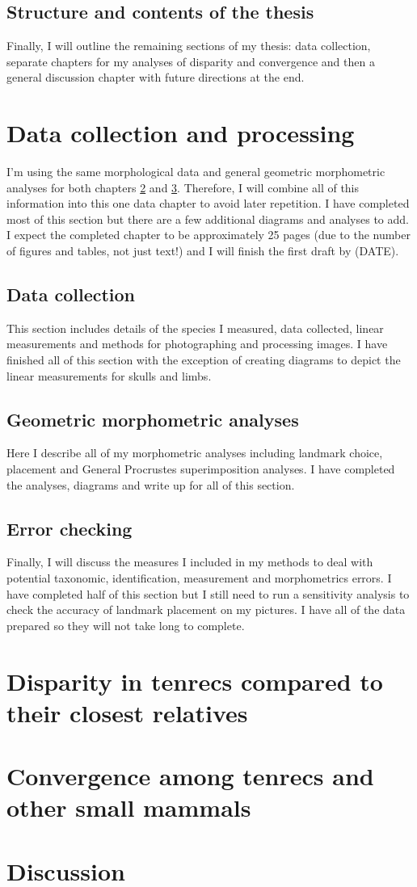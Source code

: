 \documentclass[12pt,a4paper]{article}
\begin{document}
	\subsection{Structure and contents of the thesis}
		\label{int_struc} 
		Finally, I will outline the remaining sections of my thesis: data collection, separate chapters for my analyses of disparity and convergence and then a general discussion chapter with future directions at the end.


\section{Data collection and processing}
	I'm using the same morphological data and general geometric morphometric analyses for both chapters \ref{sect_disp} and \ref*{sect_conv}. Therefore, I will combine all of this information into this one data chapter to avoid later repetition. I have completed most of this section but there are a few additional diagrams and analyses to add. I expect the completed chapter to be approximately 25 pages (due to the number of figures and tables, not just text!) and I will finish the first draft by (DATE).

	\subsection{Data collection}
		This section includes details of the species I measured, data collected, linear measurements and methods for photographing and processing images. I have finished all of this section with the exception of creating diagrams to depict the linear measurements for skulls and limbs.

	\subsection{Geometric morphometric analyses}
		Here I describe all of my morphometric analyses including landmark choice, placement and General Procrustes superimposition analyses. I have completed the analyses, diagrams and write up for all of this section.
		
	\subsection{Error checking}
		Finally, I will discuss the measures I included in my methods to deal with potential taxonomic, identification, measurement and morphometrics errors. I have completed half of this section but I still need to run a sensitivity analysis to check the accuracy of landmark placement on my pictures. I have all of the data prepared so they will not take long to complete.

\section{Disparity in tenrecs compared to their closest relatives}
	\label{sect_disp}

\section{Convergence among tenrecs and other small mammals}
	\label{sect_conv}

\section{Discussion}
\end{document}
